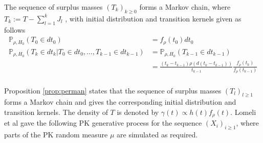 \begin{proposition} \label{prop:perman}
The sequence of surplus masses $\left(T_k \right)_{k \ge 0}$ forms a Markov chain, where $T_k := T - \sum_{l=1}^k J_l$ , with initial distribution and transition kernels given as follows
\begin{equation*}
\begin{aligned}
\mathbb{P}_{\rho,H_0}(T_0 \in dt_0) &= f_\rho(t_0)dt_0 \\
\mathbb{P}_{\rho,H_0}(T_k \in dt_k|T_0 \in dt_0,\dots, T_{k-1} \in dt_{k-1}) &=  \mathbb{P}_{\rho,H_0}(T_{k-1} \in dt_{k-1})\\
&= \frac{(t_k-t_{k-1})\rho(d(t_k-t_{k-1}))}{t_{k-1}} \frac{f_\rho(t_{k})}{f_\rho(t_{k-1})} \\
\end{aligned}
\end{equation*}
\end{proposition}

Proposition \ref{prop:perman} \cite{Perman:1992ke} states that the sequence of surplus masses $(T_l)_{l \ge 1}$ forms a Markov chain and gives the corresponding initial distribution and transition kernels. The density of $T$ is denoted by $\gamma(t) \propto h(t) f_\rho(t)$. Lomeli et al \cite{Lomeli:2015vd} gave the following \gls{PK} generative process for the sequence $(X_i)_{i \ge 1}$, where parts of the \gls{PK} random measure $\mu$ are simulated as required.

